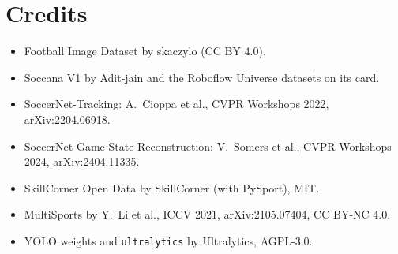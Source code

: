 \documentclass[11pt, a4paper]{article}
\begin{document}
\section{Credits}
\begin{itemize}
    \item Football Image Dataset by skaczylo (CC BY 4.0).
    \item Soccana V1 by Adit-jain and the Roboflow Universe datasets on its card.
    \item SoccerNet-Tracking: A.~Cioppa et al., CVPR Workshops 2022, arXiv:2204.06918.
    \item SoccerNet Game State Reconstruction: V.~Somers et al., CVPR Workshops 2024, arXiv:2404.11335.
    \item SkillCorner Open Data by SkillCorner (with PySport), MIT.
    \item MultiSports by Y.~Li et al., ICCV 2021, arXiv:2105.07404, CC BY-NC 4.0.
    \item YOLO weights and \texttt{ultralytics} by Ultralytics, AGPL-3.0.
\end{itemize}
\end{document}

